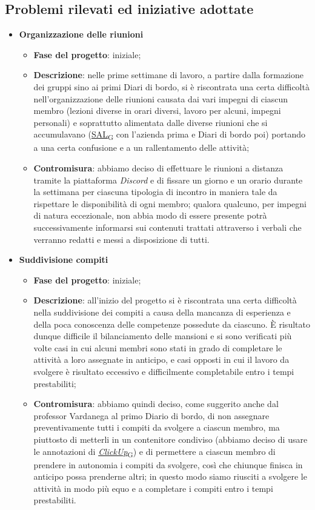 \subsection{Problemi rilevati ed iniziative adottate}
\begin{itemize}
    \item \textbf{Organizzazione delle riunioni}
    \begin{itemize}
        \item \textbf{Fase del progetto}: iniziale;
        \item \textbf{Descrizione}: nelle prime settimane di lavoro, a partire dalla formazione dei gruppi sino ai primi Diari di bordo, si è riscontrata una certa difficoltà nell'organizzazione delle riunioni causata dai vari impegni di ciascun membro (lezioni diverse in orari diversi, lavoro per alcuni, impegni personali) e soprattutto alimentata dalle diverse riunioni che si accumulavano (\href{https://7last.github.io/docs/pb/documentazione-interna/glossario\#stato-avanzamento-lavori}{SAL\textsubscript{G}} con l'azienda prima e Diari di bordo poi) portando a una certa confusione e a un rallentamento delle attività;
        \item \textbf{Contromisura}: abbiamo deciso di effettuare le riunioni a distanza tramite la piattaforma \textit{Discord} e di fissare un giorno e un orario durante la settimana per ciascuna tipologia di incontro in maniera tale da rispettare le disponibilità di ogni membro; qualora qualcuno, per impegni di natura eccezionale, non abbia modo di essere presente potrà successivamente informarsi sui contenuti trattati attraverso i verbali che verranno redatti e messi a disposizione di tutti.
    \end{itemize}
    \item \textbf{Suddivisione compiti}
    \begin{itemize}
        \item \textbf{Fase del progetto}: iniziale;
        \item \textbf{Descrizione}: all'inizio del progetto si è riscontrata una certa difficoltà nella suddivisione dei compiti a causa della mancanza di esperienza e della poca conoscenza delle competenze possedute da ciascuno. È risultato dunque difficile il bilanciamento delle mansioni e si sono verificati più volte casi in cui alcuni membri sono stati in grado di completare le attività a loro assegnate in anticipo, e casi opposti in cui il lavoro da svolgere è risultato eccessivo e difficilmente completabile entro i tempi prestabiliti;
        \item \textbf{Contromisura}: abbiamo quindi deciso, come suggerito anche dal professor Vardanega al primo Diario di bordo, di non assegnare preventivamente tutti i compiti da svolgere a ciascun membro, ma piuttosto di metterli in un contenitore condiviso (abbiamo deciso di usare le annotazioni di \href{https://7last.github.io/docs/pb/documentazione-interna/glossario\#clickup}{\textit{ClickUp}\textsubscript{G}}) e di permettere a ciascun membro di prendere in autonomia i compiti da svolgere, così che chiunque finisca in anticipo possa prenderne altri; in questo modo siamo riusciti a svolgere le attività in modo più equo e a completare i compiti entro i tempi prestabiliti.

\end{itemize}
\end{itemize}

